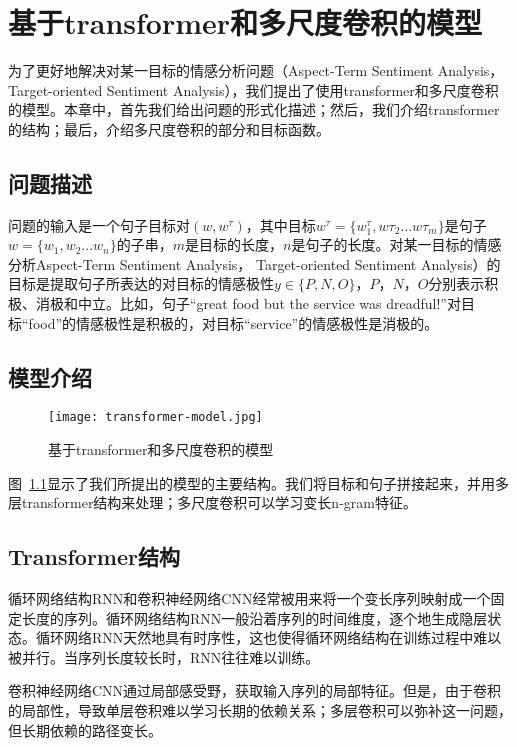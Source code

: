 \chapter{基于transformer和多尺度卷积的模型}
\label{cha:transformer}

为了更好地解决对某一目标的情感分析问题（Aspect-Term Sentiment Analysis， Target-oriented Sentiment Analysis），我们提出了使用transformer和多尺度卷积的模型。本章中，首先我们给出问题的形式化描述；然后，我们介绍transformer的结构；最后，介绍多尺度卷积的部分和目标函数。

\section{问题描述}

问题的输入是一个句子目标对$(w,w^\tau)$，其中目标$w^\tau=\{w^\tau_1,w\tau_2...w\tau_m\}$是句子$w=\{w_1,w_2...w_n\}$的子串，$m$是目标的长度，$n$是句子的长度。对某一目标的情感分析Aspect-Term Sentiment Analysis， Target-oriented Sentiment Analysis）的目标是提取句子所表达的对目标的情感极性$y\in \{P, N, O\}$，$P$，$N$，$O$分别表示积极、消极和中立。比如，句子“great food but the service was dreadful!”对目标“food”的情感极性是积极的，对目标“service”的情感极性是消极的。

\section{模型介绍}

\begin{figure}[ht]
    \centering  
    \texttt{[image: transformer-model.jpg]}
    \caption{基于transformer和多尺度卷积的模型}
    \label{fig:transformer-model}
\end{figure}

图~\ref{fig:transformer-model}显示了我们所提出的模型的主要结构。我们将目标和句子拼接起来，并用多层transformer结构来处理；多尺度卷积可以学习变长n-gram特征。

\section{Transformer结构}

循环网络结构RNN和卷积神经网络CNN经常被用来将一个变长序列映射成一个固定长度的序列。循环网络结构RNN一般沿着序列的时间维度，逐个地生成隐层状态。循环网络RNN天然地具有时序性，这也使得循环网络结构在训练过程中难以被并行。当序列长度较长时，RNN往往难以训练。

卷积神经网络CNN通过局部感受野，获取输入序列的局部特征。但是，由于卷积的局部性，导致单层卷积难以学习长期的依赖关系；多层卷积可以弥补这一问题，但长期依赖的路径变长。

